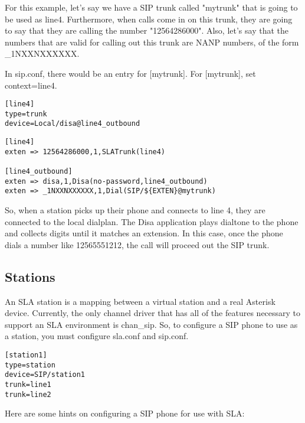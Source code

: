 For this example, let's say we have a SIP trunk called "mytrunk" that is going
to be used as line4.  Furthermore, when calls come in on this trunk, they are
going to say that they are calling the number "12564286000".  Also, let's say
that the numbers that are valid for calling out this trunk are NANP numbers,
of the form \_1NXXNXXXXXX.

In sip.conf,  there would be an entry for [mytrunk].  For [mytrunk],
set context=line4.

\begin{astlisting}
\begin{verbatim}
[line4]
type=trunk
device=Local/disa@line4_outbound
\end{verbatim}
\end{astlisting}

\begin{astlisting}
\begin{verbatim}
[line4]
exten => 12564286000,1,SLATrunk(line4)

[line4_outbound]
exten => disa,1,Disa(no-password,line4_outbound)
exten => _1NXXNXXXXXX,1,Dial(SIP/${EXTEN}@mytrunk)
\end{verbatim}
\end{astlisting}

So, when a station picks up their phone and connects to line 4, they are
connected to the local dialplan.  The Disa application plays dialtone to the
phone and collects digits until it matches an extension.  In this case, once
the phone dials a number like 12565551212, the call will proceed out the
SIP trunk.

\subsection{Stations}

An SLA station is a mapping between a virtual station and a real Asterisk device.
Currently, the only channel driver that has all of the features necessary to
support an SLA environment is chan\_sip.  So, to configure a SIP phone to use
as a station, you must configure sla.conf and sip.conf.

\begin{astlisting}
\begin{verbatim}
[station1]
type=station
device=SIP/station1
trunk=line1
trunk=line2
\end{verbatim}
\end{astlisting}

Here are some hints on configuring a SIP phone for use with SLA:

